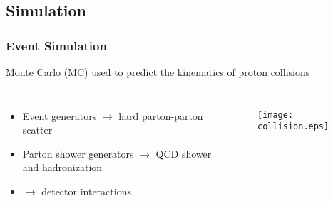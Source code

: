 \subsection{Simulation}

\begin{frame}
\frametitle{Event Simulation}

\centering
Monte Carlo (MC) used to predict the kinematics of proton collisions

\begin{columns}
\begin{itemize}
\item Event generators $\to$ hard parton-parton scatter
\item Parton shower generators $\to$ QCD shower and hadronization
\item {} $\to$ detector interactions
\end{itemize}

\begin{figure}
\texttt{[image: collision.eps]}
\end{figure}
\end{columns}
\end{frame}
